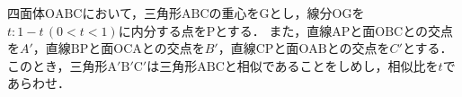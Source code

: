 \documentclass[../../main.tex]{subfiles}
\begin{document}
四面体$\mathrm{OABC}$において，三角形$\mathrm{ABC}$の重心を$\mathrm{G}$とし，線分$\mathrm{OG}$を$t:1-t\, (0<t<1)$に内分する点を$\mathrm{P}$とする．
また，直線$\mathrm{AP}$と面$\mathrm{OBC}$との交点を$A'$，直線$\mathrm{BP}$と面$\mathrm{OCA}$との交点を$B'$，直線$\mathrm{CP}$と面$\mathrm{OAB}$との交点を$C'$とする．
このとき，三角形$\mathrm{A'B'C'}$は三角形$\mathrm{ABC}$と相似であることをしめし，相似比を$t$であらわせ．
\end{document}
